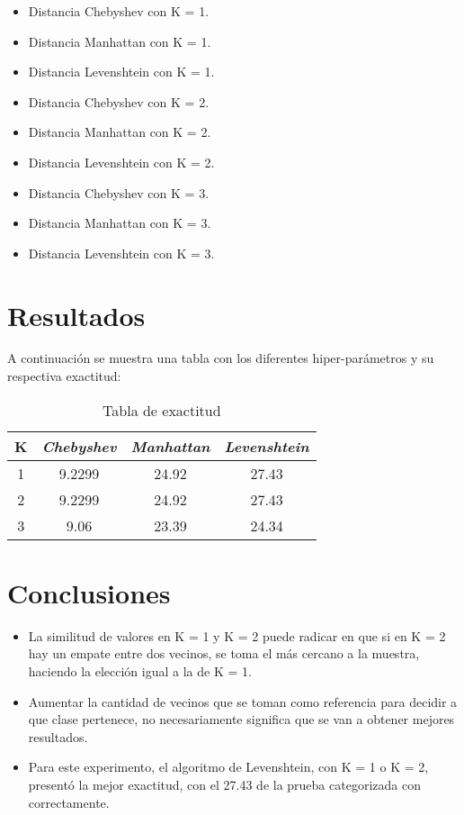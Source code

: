 \documentclass[conference]{IEEEtran}
\begin{document}
\begin{itemize}
\item Distancia Chebyshev con K = 1.
\item Distancia Manhattan con K = 1.
\item Distancia Levenshtein con K = 1.
\item Distancia Chebyshev con K = 2.
\item Distancia Manhattan con K = 2.
\item Distancia Levenshtein con K = 2.
\item Distancia Chebyshev con K = 3.
\item Distancia Manhattan con K = 3.
\item Distancia Levenshtein con K = 3.
\end{itemize}

\section{Resultados}

A continuación se muestra una tabla con los diferentes hiper-parámetros y su respectiva exactitud:

\begin{table}[htbp]
\caption{Tabla de exactitud}
\begin{center}
\begin{tabular}{|c|c|c|c|}
\hline
\textbf{K} & \textbf{\textit{Chebyshev}}& \textbf{\textit{Manhattan}}& \textbf{\textit{Levenshtein}} \\
\hline
1 & 9.2299 & 24.92 & 27.43 \\
\hline
2 & 9.2299 & 24.92 & 27.43 \\
\hline
3 & 9.06 & 23.39 & 24.34 \\
\hline
\end{tabular}
\end{center}
\end{table}

\section{Conclusiones}

\begin{itemize}
\item La similitud de valores en K = 1 y K = 2 puede radicar en que si en K = 2 hay un empate entre dos vecinos, se toma el más cercano a la muestra, haciendo la elección igual a la de K = 1.
\item Aumentar la cantidad de vecinos que se toman como referencia para decidir a que clase pertenece, no necesariamente significa que se van a obtener mejores resultados.
\item Para este experimento, el algoritmo de Levenshtein, con K = 1 o K = 2, presentó la mejor exactitud, con el 27.43 de la prueba categorizada con correctamente.
\end{itemize}
\end{document}

